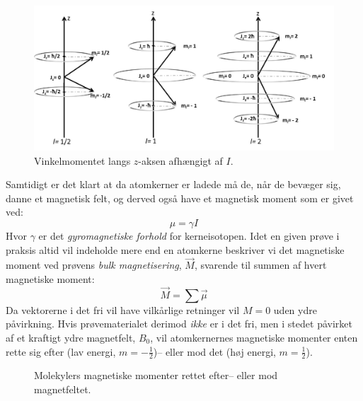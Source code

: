     \begin{figure}[H]\centering
        \includegraphics[width=\textwidth]{billeder/projektion}
        \caption{Vinkelmomentet langs $z$-aksen afhængigt af $I$.}
    \end{figure}
    Samtidigt er det klart at da atomkerner er ladede må de, når de bevæger sig, danne et magnetisk felt, og derved også have et magnetisk moment som er givet ved:
    \[
        \mu = \gamma I
    \]
    Hvor $\gamma$ er det \textit{gyromagnetiske forhold} for kerneisotopen. Idet en given prøve i praksis altid vil indeholde mere end en atomkerne beskriver vi det magnetiske moment ved prøvens \textit{bulk magnetisering}, $\vec{M}$, svarende til summen af hvert magnetiske moment:
    \[
        \vec{M}=\sum\vec{\mu}
    \]
    Da vektorerne i det fri vil have vilkårlige retninger vil $M=0$ uden ydre påvirkning. Hvis prøvematerialet derimod \textit{ikke}  er i det fri, men i stedet påvirket af et kraftigt ydre magnetfelt, $B_0$, vil atomkernernes magnetiske momenter enten rette sig efter (lav energi, $m=-\frac{1}{2}$)-- eller mod det (høj energi, $m=\frac{1}{2}$). 
    \begin{figure}[H]\centering
        \caption{Molekylers magnetiske momenter rettet efter-- eller mod magnetfeltet.}
    \end{figure}
